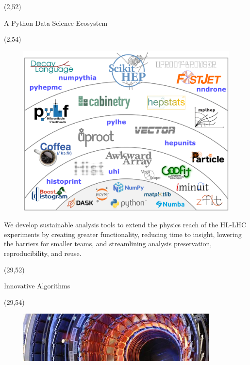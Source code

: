 \documentclass[final]{beamer}
\begin{document}
\begin{frame}{}
\begin{textblock}{25.0}(2,52)
\begin{block}{A Python Data Science Ecosystem}
\begin{textblock}{25.0}(2,54)
\begin{figure}[tbph]
\centering
\includegraphics[width=1.00\textwidth]{images/scikit-hep-shells-hep.png}
\end{figure}
We develop sustainable analysis tools to extend the physics reach of the HL-LHC experiments by creating greater functionality, reducing time to insight, lowering the barriers for smaller teams, and streamlining analysis preservation, reproducibility, and reuse.
\end{textblock}
\end{block}
\end{textblock}
\begin{textblock}{25.0}(29,52)
\begin{block}{Innovative Algorithms}
\begin{textblock}{25.0}(29,54)
\begin{figure}[tbph]
\centering
\includegraphics[width=0.90\textwidth]{images/0610026_01-A5-at-72-dpi-slice.jpg}

\end{figure}
\end{textblock}
\end{block}
\end{textblock}
\end{frame}
\end{document}

